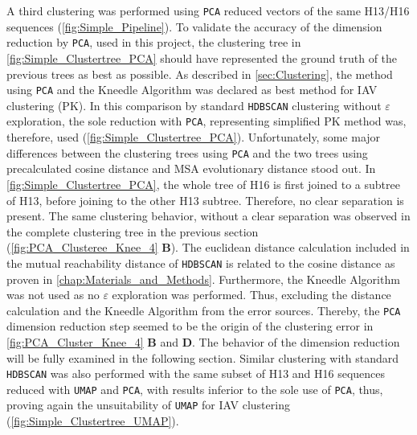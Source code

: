A third clustering was performed using \texttt{PCA} reduced vectors of the same H13/H16 sequences (\autoref{fig:Simple_Pipeline}). To validate the accuracy of the dimension reduction by \texttt{PCA}, used in this project, the clustering tree in \autoref{fig:Simple_Clustertree_PCA} should have represented the ground truth of the previous trees as best as possible. As described in \autoref{sec:Clustering}, the method using \texttt{PCA} and the Kneedle Algorithm was declared as best method for \gls{IAV} clustering (PK). In this comparison by standard \texttt{HDBSCAN} clustering without $\varepsilon$ exploration, the sole reduction with \texttt{PCA}, representing simplified PK method was, therefore, used (\autoref{fig:Simple_Clustertree_PCA}). Unfortunately, some major differences between the clustering trees using \texttt{PCA} and the two trees using precalculated cosine distance and \gls{MSA} evolutionary distance stood out. In \autoref{fig:Simple_Clustertree_PCA}, the whole tree of H16 is first joined to a subtree of H13, before joining to the other H13 subtree. Therefore, no clear separation is present. The same clustering behavior, without a clear separation was observed in the complete clustering tree in the previous section (\autoref{fig:PCA_Clusteree_Knee_4} \textbf{\textsf{B}}). The euclidean distance calculation included in the mutual reachability distance of \texttt{HDBSCAN} is related to the cosine distance as proven in \autoref{chap:Materials_and_Methods}. Furthermore, the Kneedle Algorithm was not used as no $\varepsilon$ exploration was performed. Thus, excluding the distance calculation and the Kneedle Algorithm from the error sources. Thereby, the \texttt{PCA} dimension reduction step seemed to be the origin of the clustering error in \autoref{fig:PCA_Cluster_Knee_4} \textbf{\textsf{B}} and \textbf{\textsf{D}}. The behavior of the dimension reduction will be fully examined in the following section. %
Similar clustering with standard \texttt{HDBSCAN} was also performed with the same subset of H13 and H16 sequences reduced with \texttt{UMAP} and \texttt{PCA}, with results inferior to the sole use of \texttt{PCA}, thus, proving again the unsuitability of \texttt{UMAP} for \gls{IAV} clustering (\autoref{fig:Simple_Clustertree_UMAP}).%